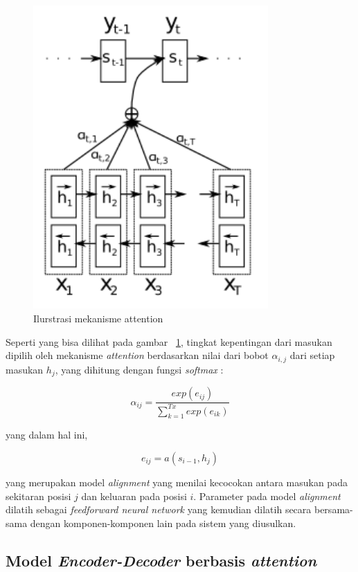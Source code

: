 \begin{figure}[h]
    \centering
    \includegraphics[width=0.8\textwidth]{resources/images/mekanisme-attention.png}
    \caption{Ilurstrasi mekanisme attention \parencite{Bahdanau2015}}
    \label{fig:attention}
\end{figure}

Seperti yang bisa dilihat pada gambar ~\ref{fig:attention}, tingkat kepentingan dari masukan dipilih oleh mekanisme \textit{attention} berdasarkan nilai dari bobot \(\alpha_{i,j}\) dari setiap masukan \(h_{j}\), yang dihitung dengan fungsi \textit{softmax} \parencite{Bahdanau2015}:

\[
    \alpha_{ij} = \frac{exp(e_{ij})}{\displaystyle\sum_{k=1}^{T_{}x} exp(e_{ik})}
\]

yang dalam hal ini,

\[
    e_{ij} = a(s_{i-1}, h_{j})
\]

yang merupakan model \textit{alignment} yang menilai kecocokan antara masukan pada sekitaran posisi \(j\) dan keluaran pada posisi \(i\). Parameter pada model \textit{alignment}  dilatih sebagai \textit{feedforward neural network} yang kemudian dilatih secara bersama-sama dengan komponen-komponen lain pada sistem yang diusulkan.


\subsection{Model \textit{Encoder-Decoder} berbasis \textit{attention}}
\label{subsec:encoder-decoder-attention}

